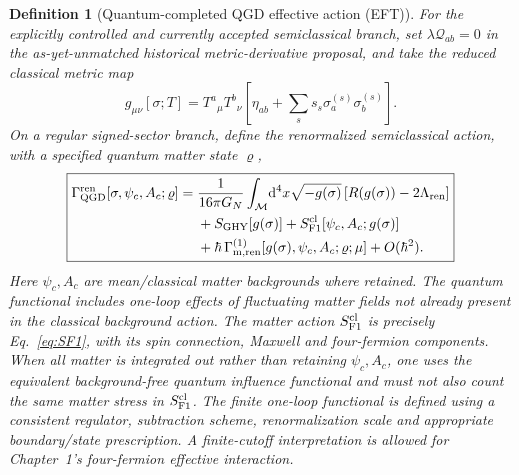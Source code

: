 \documentclass[11pt,a4paper]{article}
\newtheorem{definition}[theorem]{Definition}
\newcommand{\dd}{\mathrm d}
\begin{document}
\begin{definition}[Quantum-completed QGD effective action (EFT)]\label{def:qgd136}
For the explicitly controlled and currently accepted semiclassical branch,
set $\lambda\mathcal Q_{ab}=0$ in the as-yet-unmatched historical
metric-derivative proposal, and take the reduced classical metric map
\begin{equation}\label{eq:qgd136metric}
 g_{\mu\nu}[\sigma;T]=T^a{}_{\mu}T^b{}_{\nu}
 \left[\eta_{ab}+\sum_s s_s\sigma_a^{(s)}\sigma_b^{(s)}\right].
\end{equation}
On a regular signed-sector branch, define the \emph{renormalized}
semiclassical action, with a specified quantum matter state $\varrho$,
\begin{equation}\label{eq:qgd136final}
\boxed{\begin{aligned}
\Gamma_{\rm QGD}^{\rm ren}[\sigma,\psi_c,A_c;\varrho]={}&
\frac{1}{16\pi G_N}\int_{\mathcal M}\!\dd^4x\sqrt{-g(\sigma)}
\,[R(g(\sigma))-2\Lambda_{\rm ren}]\\
&+S_{\rm GHY}[g(\sigma)]
+S_{\rm F1}^{\rm cl}[\psi_c,A_c;g(\sigma)]\\
&+\hbar\,\Gamma_{\rm m,ren}^{(1)}
[g(\sigma),\psi_c,A_c;\varrho;\mu]
+O(\hbar^2).
\end{aligned}}
\end{equation}
Here $\psi_c,A_c$ are mean/classical matter backgrounds where retained.
The quantum functional includes one-loop effects of fluctuating matter
fields \emph{not already present in the classical background action}.
The matter action $S_{\rm F1}^{\rm cl}$ is precisely Eq.~\eqref{eq:SF1},
with its spin connection, Maxwell and four-fermion components. When
\emph{all} matter is integrated out rather than retaining $\psi_c,A_c$,
one uses the equivalent background-free quantum influence functional and
must not also count the same matter stress in $S_{\rm F1}^{\rm cl}$.
The finite one-loop functional is defined using a consistent regulator,
subtraction scheme, renormalization scale and appropriate boundary/state
prescription. A finite-cutoff interpretation is allowed for Chapter~1's
four-fermion effective interaction.
\end{definition}
\end{document}
